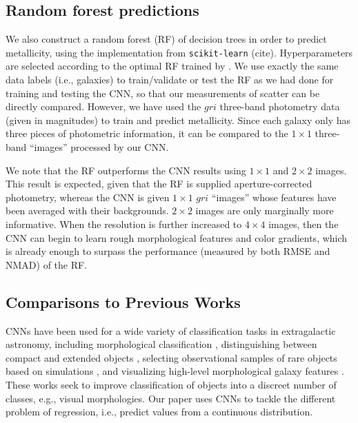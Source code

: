 \documentclass[fleqn,usenatbib]{mnras}
\begin{document}
\subsection{Random forest predictions}
We also construct a random forest (RF) of decision trees in order to predict metallicity, using the implementation from \texttt{scikit-learn} (cite).
Hyperparameters are selected according to the optimal RF trained by \cite{2016MNRAS.456.1618A}.
We use exactly the same data labels (i.e., galaxies) to train/validate or test the RF as we had done for training and testing the CNN, so that our measurements of scatter can be directly compared.
However, we have used the $gri$ three-band photometry data (given in magnitudes) to train and predict metallicity.
Since each galaxy only has three pieces of photometric information, it can be compared to the $1 \times 1$ three-band ``images'' processed by our CNN.


We note that the RF outperforms the CNN results using $1\times 1$ and $2 \times 2$ images.
This result is expected, given that the RF is supplied aperture-corrected photometry, whereas the CNN is given $1 \times 1 $ $gri$ ``images'' whose features have been averaged with their backgrounds.
$2 \times 2$ images are only marginally more informative.
When the resolution is further increased to $4 \times 4$ images, then the CNN can begin to learn rough morphological features and color gradients, which is already enough to surpass the performance (measured by both RMSE and NMAD) of the RF.

\subsection{Comparisons to Previous Works}\label{sec:previous work}

CNNs have been used for a wide variety of classification tasks in extragalactic astronomy, including morphological classification \citep[see, e.g.,][]{2015MNRAS.450.1441D,2015ApJS..221....8H,2017MNRAS.464.4420S}, distinguishing between compact and extended objects \citep{2017MNRAS.464.4463K}, selecting observational samples of rare objects based on simulations \citep{2018ApJ...858..114H,2018MNRAS.473.3895L}, and visualizing high-level morphological galaxy features \citep{2018arXiv180705657D}.
These works seek to improve classification of objects into a discreet number of classes, e.g., visual morphologies.
Our paper uses CNNs to tackle the different problem of regression, i.e., predict values from a continuous distribution.
\end{document}

